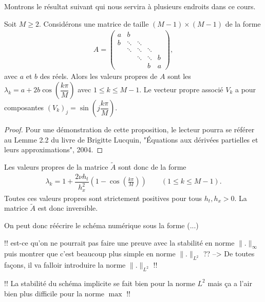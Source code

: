 \documentclass[12pt,a4paper,twoside]{article}
\begin{document}
Montrons le r\'esultat suivant qui nous servira \`a plusieurs endroits dans ce cours.
\begin{proposition}
  Soit $M \geq 2$.
  Consid\'erons une matrice de taille $(M-1) \times (M-1)$ de la forme 
  \begin{align*}
    A = 
    \begin{pmatrix}
      a & b 
      \\
      b & \ddots & \ddots
      \\
      & \ddots & \ddots & \ddots 
      \\
      &&\ddots & \ddots & b
      \\
      &&& b & a
    \end{pmatrix} ,
  \end{align*}
  avec $a$ et $b$ des r\'eels.
  Alors les valeurs propres de $A$ sont les 
  $\lambda_k = a + 2b \cos \left( \dfrac{k \pi}{M} \right)$ avec $1 \leq k \leq M-1$.
  Le vecteur propre associ\'e $V_k$ a pour composantes 
  $(V_k)_j = \sin \left( j \dfrac{k \pi}{M} \right)$.
\end{proposition}

\begin{proof}
  Pour une d\'emonstration de cette proposition, le lecteur pourra se r\'ef\'erer au 
  Lemme 2.2 du livre 
  de Brigitte Lucquin, "\'Equations aux d\'eriv\'ees partielles et leurs approximations", 2004.
\end{proof}

Les valeurs propres de la matrice $\widetilde{A}$ sont donc de la forme
\begin{align*}
  \lambda_k = 1 + \dfrac{2 \nu h_t}{h_x^2} \left(1 - \cos \left(\frac{k \pi}{M} \right) \right)
  \qquad (1 \leq k \leq M-1) .
\end{align*}
Toutes ces valeurs propres sont strictement positives pour tous $h_t , h_x > 0$. 
La matrice $\widetilde{A}$ est donc inversible.


On peut donc r\'e\'ecrire le sch\'ema num\'erique sous la forme
(...)



!! est-ce qu'on ne pourrait pas faire une preuve avec la stabilit\'e en norme
$\| . \|_{\infty}$ puis montrer que c'est beaucoup plus simple
en norme $\| . \|_{L^2}$ ??
--> De toutes fa\c{c}ons, il va falloir introduire la norme $\|.\|_{L^2}$ !!

!! La stabilit\'e du sch\'ema implicite se fait bien pour la norme
$L^2$ mais \c{c}a a l'air bien plus difficile pour la norme $\max$ !!
\end{document}
